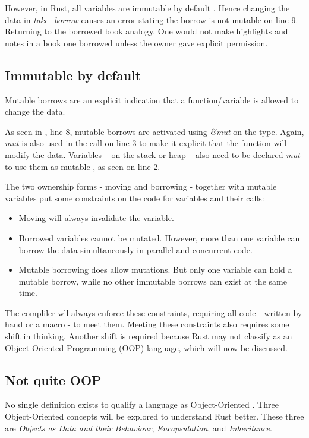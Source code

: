 However, in Rust, all variables are immutable by default \cite{klabnik_2019_01}.
Hence changing the data in \textit{take\_borrow} causes an error stating the borrow is not mutable on line 9.
Returning to the borrowed book analogy.
One would not make highlights and notes in a book one borrowed unless the owner gave explicit permission.

\subsection{Immutable by default}
Mutable borrows are an explicit indication that a function/variable is allowed to change the data.


As seen in , line 8, mutable borrows are activated using \textit{\&mut } on the type.
Again, \textit{mut} is also used in the call on line 3 to make it explicit that the function will modify the data.
Variables -- on the stack or heap -- also need to be declared \textit{mut} to use them as mutable \cite{klabnik_2019_01}, as seen on line 2.

The two ownership forms - moving and borrowing - together with mutable variables put some constraints on the code for variables and their calls: \cite{klabnik_2019_01}
\begin{itemize}
	\item Moving will always invalidate the variable.
	\item Borrowed variables cannot be mutated.
	      However, more than one variable can borrow the data simultaneously in parallel and concurrent code.
	\item Mutable borrowing does allow mutations.
	      But only one variable can hold a mutable borrow, while no other immutable borrows can exist at the same time.
\end{itemize}

The compliler wll always enforce these constraints, requiring all code - written by hand or a macro - to meet them.
Meeting these constraints also requires some shift in thinking.
Another shift is required because Rust may not classify as an Object-Oriented Programming (OOP) language, which will now be discussed.

\subsection{Not quite OOP}
No single definition exists to qualify a language as Object-Oriented \cite{meyer_97_01,stefik_85_01,gamma_94_01,klabnik_2019_01}.
Three Object-Oriented concepts will be explored to understand Rust better.
These three are \textit{Objects as Data and their Behaviour}, \textit{Encapsulation}, and \textit{Inheritance}.

